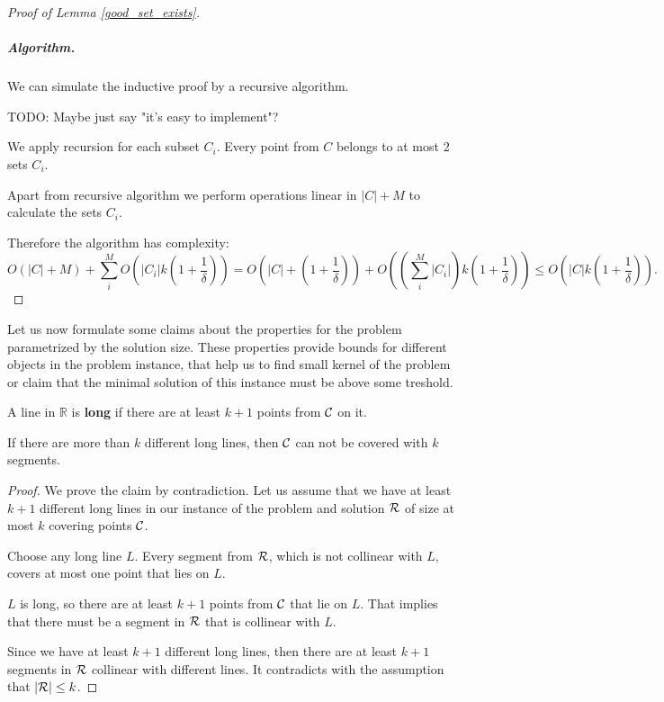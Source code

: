 \begin{proof}[Proof of Lemma \ref{good_set_exists}]
\subparagraph{Algorithm.}

We can simulate the inductive proof by a recursive algorithm.

TODO: Maybe just say "it's easy to implement"?

We apply recursion for each subset $C_i$. Every point
from $C$ belongs to at most 2 sets $C_i$.

Apart from recursive algorithm we perform operations linear in
$|C| + M$ to calculate the sets $C_i$.

Therefore the algorithm has complexity:
$$O(|C|+M) + \sum_i^M O(|C_i|k(1+\frac{1}{\delta})) = 
O(|C| + (1+\frac{1}{\delta})) + O((\sum_i^M |C_i|)k(1+\frac{1}{\delta}))
\le O(|C|k(1+\frac{1}{\delta})).$$

\end{proof}

Let us now formulate some claims about the
properties for the problem parametrized by the solution size.
These properties provide bounds for different
objects in the problem instance,
that help us to find small kernel of the problem
or claim that the minimal
solution of this instance must be above some treshold.

\begin{defi}
A line in $\mathbb{R}$ is \textbf{long} if there are at least $k+1$ points from $\mathcal{C}$ on it.
\end{defi}

\begin{claim}
\label{few_long_lines}
If there are more than $k$ different long lines, then 
$\mathcal{C}$ can not be covered with $k$ segments.
\end{claim}

\begin{proof}
We prove the claim by contradiction.
Let us assume that we have at least $k+1$ different
long lines in our instance of the problem
and solution $\mathcal{R}$ of size at most $k$
covering points $\mathcal{C}$.

Choose any long line $L$.
Every segment from $\mathcal{R}$, which is not collinear with $L$,
covers at most one point that lies on $L$.

$L$ is long, so there are at least $k+1$ points from $\mathcal{C}$ that lie on $L$.
That implies that there must be a segment in $\mathcal{R}$ that is
collinear with $L$.

Since we have at least $k+1$ different long lines,
then there are at least $k+1$
segments in $\mathcal{R}$ collinear with different lines.
It contradicts with the assumption that $|\mathcal{R}| \le k$.
\end{proof}

